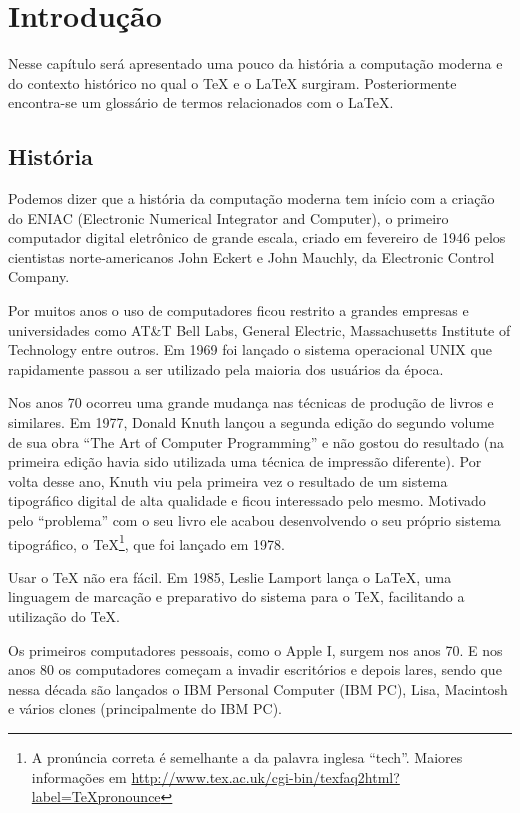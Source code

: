 \chapter{Introdução} \label{sch:intro}
Nesse capítulo será apresentado uma pouco da história a computação moderna e do
contexto histórico no qual o TeX e o LaTeX surgiram. Posteriormente encontra-se
um glossário de termos relacionados com o LaTeX.

\section{História}
Podemos dizer que a história da computação moderna tem início com a criação do
ENIAC (Electronic Numerical Integrator and Computer), o primeiro computador
digital eletrônico de grande escala, criado em fevereiro de 1946 pelos
cientistas norte-americanos John Eckert e John Mauchly, da Electronic Control
Company.\nocite{Wikipedia:PT:ENIAC}

Por muitos anos o uso de computadores ficou restrito a grandes empresas e
universidades como AT\&T Bell Labs, General Electric, Massachusetts Institute of
Technology entre outros. Em 1969 foi lançado o sistema operacional UNIX que
rapidamente passou a ser utilizado pela maioria dos usuários da
época.\nocite{Wikipedia:EN:UNIX}

Nos anos 70 ocorreu uma grande mudança nas técnicas de produção de livros e
similares. Em 1977, Donald Knuth lançou a segunda edição do segundo volume de
sua obra ``The Art of Computer Programming'' e não gostou do resultado (na
primeira edição havia sido utilizada uma técnica de impressão diferente). Por
volta desse ano, Knuth viu pela primeira vez o resultado de um sistema
tipográfico digital de alta qualidade e ficou interessado pelo mesmo. Motivado
pelo ``problema'' com o seu livro ele acabou desenvolvendo o seu próprio sistema
tipográfico, o TeX\footnote{A pronúncia correta é semelhante a da palavra
inglesa ``tech''. Maiores informações em
\url{http://www.tex.ac.uk/cgi-bin/texfaq2html?label=TeXpronounce}}, que foi
lançado em 1978.\nocite{Wikipedia:EN:TeX}

Usar o TeX não era fácil. Em 1985, Leslie Lamport lança o LaTeX, uma linguagem
de marcação e preparativo do sistema para o TeX, facilitando a utilização do
TeX.\nocite{Wikipedia:EN:LaTeX}

Os primeiros computadores pessoais, como o Apple I, surgem nos anos 70. E nos
anos 80 os computadores começam a invadir escritórios e depois lares, sendo que
nessa década são lançados o IBM Personal Computer (IBM PC), Lisa, Macintosh e
vários clones (principalmente do IBM PC).

